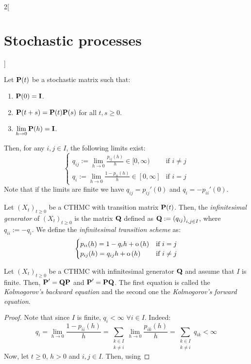 \documentclass[../../../main_math.tex]{subfiles}
\begin{document}
\begin{multicols}{2}[\section{Stochastic processes}]
\begin{theorem}
    Let $\boldsymbol{\mathrm{P}}(t)$ be a stochastic matrix such that:
    \begin{enumerate}\label{SP:StochMatrixProps}
      \item $\boldsymbol{\mathrm{P}}(0) = \boldsymbol{\mathrm{I}}$.
      \item $\boldsymbol{\mathrm{P}}(t+s) = \boldsymbol{\mathrm{P}}(t)\boldsymbol{\mathrm{P}}(s)$ for all $t,s\geq 0$.
      \item $\displaystyle\lim_{h\to 0} \boldsymbol{\mathrm{P}} (h)=\boldsymbol{\mathrm{I}}$.
    \end{enumerate}
    Then, for any $i,j\in I$, the following limits exist:
    $$
      \begin{cases}
        q_{ij}:=\displaystyle\lim_{h\to 0} \frac{p_{ij}(h)}{h}\in[0,\infty) & \text{if } i\neq j \\
        q_i:= \displaystyle\lim_{h\to 0} \frac{1-p_{ii}(h)}{h}\in[0,\infty] & \text{if } i=j
      \end{cases}
    $$
    Note that if the limits are finite we have $q_{ij} = {p_{ij}}'(0)$ and $q_i = -{p_{ii}}'(0)$.
  \end{theorem}
  \begin{definition}
    Let ${(X_t)}_{t\geq 0}$ be a CTHMC with transition matrix $\boldsymbol{\mathrm{P}}(t)$. Then, the \emph{infinitesimal generator} of ${(X_t)}_{t\geq 0}$ is the matrix $\boldsymbol{\mathrm{Q}}$ defined as $\boldsymbol{\mathrm{Q}}:={\left(q_{ij}\right)}_{i,j\in I}$, where $q_{ii}:=-q_i$. We define the \emph{infinitesimal transition scheme} as:
    $$
      \begin{cases}
        p_{ii}(h) = 1-q_ih+\mathrm{o}\left(h\right)  & \text{if } i=j     \\
        p_{ij}(h) = q_{ij}h+\mathrm{o}\left(h\right) & \text{if } i\neq j
      \end{cases}
    $$
  \end{definition}
  \begin{theorem}
    Let ${(X_t)}_{t\geq 0}$ be a CTHMC with infinitesimal generator $\boldsymbol{\mathrm{Q}}$ and assume that $I$ is finite. Then, $\boldsymbol{\mathrm{P}}'=\boldsymbol{\mathrm{Q}}\boldsymbol{\mathrm{P}}$ and $\boldsymbol{\mathrm{P}}'=\boldsymbol{\mathrm{P}}\boldsymbol{\mathrm{Q}}$. The first equation is called the \emph{Kolmogorov's backward equation} and the second one the \emph{Kolmogorov's forward equation}.
  \end{theorem}
  \begin{proof}
    Note that since $I$ is finite, $q_i<\infty$ $\forall i\in I$. Indeed:
    $$
      q_i=\lim_{h\to 0}\frac{1-p_{ii}(h)}{h}=\sum_{\substack{k\in I\\k\ne i}}\lim_{h\to 0}\frac{p_{ik}(h)}{h}=\sum_{\substack{k\in I\\k\ne i}}q_{ik}< \infty
    $$
    Now, let $t\geq 0$, $h>0$ and $i,j\in I$. Then, using 

\end{proof}
\end{multicols}
\end{document}
